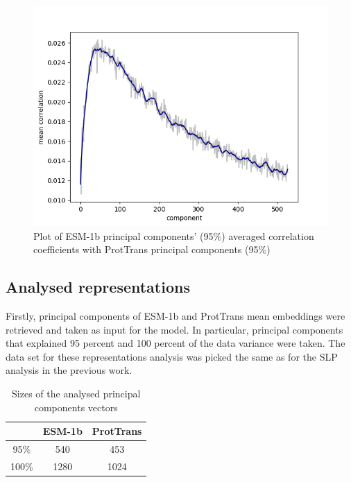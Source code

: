 \documentclass[12pt]{article}
\begin{document}
	\newpage

	\begin{figure}[h!]
		\centering
		\includegraphics[scale=0.85]{validation_small_set_2_joined_PC_95_correlation_mean.png}

		\caption{Plot of ESM-1b principal components' (95\%) averaged correlation 
		coefficients with ProtTrans principal components (95\%)}
		\label{figure:correlationComponentsMeanPC95}
	\end{figure}

	\newpage

	\subsection{Analysed representations}

	Firstly, principal components of ESM-1b and ProtTrans
	mean embeddings were retrieved and taken as input for the 
	model. In particular, principal components that explained 
	95 percent and 100 percent of the data variance were taken.
	The data set for these representations analysis was picked 
	the same as for the SLP analysis in the previous work.

	\begin{table}[h!]
		\caption{Sizes of the analysed principal components 
		vectors}
		\vspace{0.2cm}
		\centering
		\begin{tabular}{ | c | c c | }
			\hline 
			 & ESM-1b & ProtTrans \\
			\hline 
			95\% & 540 & 453 \\
			100\% & 1280 & 1024 \\
			\hline    
		\end{tabular}
		\label{table:vectorsPCADimensions}
	\end{table}
	
\end{document}

